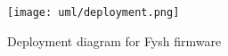 \begin{figure}[h]
	\centering
	\texttt{[image: uml/deployment.png]}
	\caption{Deployment diagram for Fysh firmware}
	\label{fig:deployment}
\end{figure}

